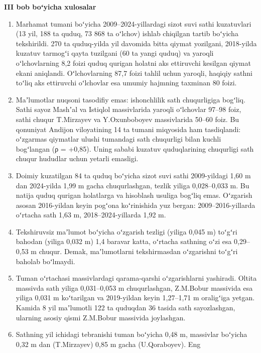 \documentclass[14pt,a4paper,oneside]{extreport}
\providecommand{\tightlist}{\setlength{\itemsep}{0pt}\setlength{\parskip}{0pt}}
\newcommand{\oakpar}[1]{\Needspace{5\baselineskip}\phantomsection\addcontentsline{toc}{section}{#1}%
  \vspace{6pt}\begin{center}\bfseries #1\end{center}\vspace{2pt}}
\begin{document}
\oakpar{III bob boʻyicha xulosalar}

\begin{enumerate}
\def\labelenumi{\arabic{enumi}.}
\tightlist
\item
  Marhamat tumani boʻyicha 2009--2024-yillardagi sizot suvi sathi
  kuzatuvlari (13 yil, 188 ta quduq, 73 868 ta oʻlchov) ishlab chiqilgan
  tartib boʻyicha tekshirildi. 270 ta quduq-yilda yil davomida bitta
  qiymat yozilgani, 2018-yilda kuzatuv tarmogʻi qayta tuzilgani (60 ta
  yangi quduq) va yaroqli oʻlchovlarning 8,2 foizi quduq qurigan holatni
  aks ettiruvchi kesilgan qiymat ekani aniqlandi. Oʻlchovlarning 87,7
  foizi tahlil uchun yaroqli, haqiqiy sathni toʻliq aks ettiruvchi
  oʻlchovlar esa umumiy hajmning taxminan 80 foizi.
\item
  Maʼlumotlar nuqsoni tasodifiy emas: ishonchlilik sath chuqurligiga
  bogʻliq. Sathi sayoz Mashʼal va Istiqlol massivlarida yaroqli
  oʻlchovlar 97--98 foiz, sathi chuqur T.Mirzayev va Y.Oxunboboyev
  massivlarida 50--60 foiz. Bu qonuniyat Andijon viloyatining 14 ta
  tumani miqyosida ham tasdiqlandi: oʻzgarmas qiymatlar ulushi tumandagi
  sath chuqurligi bilan kuchli bogʻlangan (ρ = +0,85). Uning sababi
  kuzatuv quduqlarining chuqurligi sath chuqur hududlar uchun yetarli
  emasligi.
\item
  Doimiy kuzatilgan 84 ta quduq boʻyicha sizot suvi sathi 2009-yildagi
  1,60 m dan 2024-yilda 1,99 m gacha chuqurlashgan, tezlik yiliga
  0,028--0,033 m. Bu natija quduq qurigan holatlarga va hisoblash
  usuliga bogʻliq emas. Oʻzgarish asosan 2016-yildan keyin pogʻona
  koʻrinishida yuz bergan: 2009--2016-yillarda oʻrtacha sath 1,63 m,
  2018--2024-yillarda 1,92 m.
\item
  Tekshiruvsiz maʼlumot boʻyicha oʻzgarish tezligi (yiliga 0,045 m)
  toʻgʻri bahodan (yiliga 0,032 m) 1,4 baravar katta, oʻrtacha sathning
  oʻzi esa 0,29--0,53 m chuqur. Demak, maʼlumotlarni tekshirmasdan
  oʻzgarishni toʻgʻri baholab boʻlmaydi.
\item
  Tuman oʻrtachasi massivlardagi qarama-qarshi oʻzgarishlarni yashiradi.
  Oltita massivda sath yiliga 0,031--0,053 m chuqurlashgan, Z.M.Bobur
  massivida esa yiliga 0,031 m koʻtarilgan va 2019-yildan keyin
  1,27--1,71 m oraligʻiga yetgan. Kamida 8 yil maʼlumotli 122 ta
  quduqdan 36 tasida sath sayozlashgan, ularning asosiy qismi Z.M.Bobur
  massivida joylashgan.
\item
  Sathning yil ichidagi tebranishi tuman boʻyicha 0,48 m, massivlar
  boʻyicha 0,32 m dan (T.Mirzayev) 0,85 m gacha (U.Qoraboyev). Eng

\end{enumerate}
\end{document}
